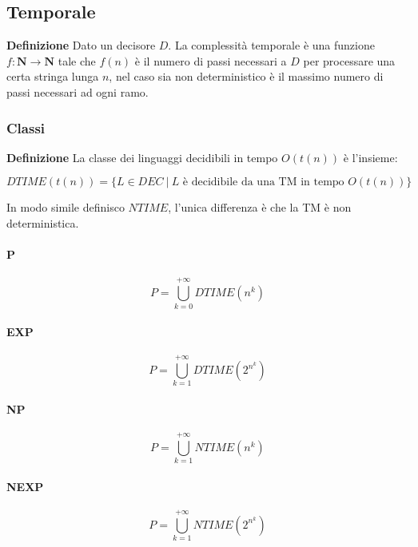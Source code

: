 \documentclass{article}
\begin{document}
\subsection{Temporale}

\textbf{Definizione} Dato un decisore $D$. La complessità temporale è una funzione $f:\mathbf{N}\rightarrow\mathbf{N}$ tale che $f(n)$ è il numero di passi necessari a $D$ per processare una certa stringa lunga $n$, nel caso sia non deterministico è il massimo numero di passi necessari ad ogni ramo.\newline

\subsubsection{Classi}

\noindent\textbf{Definizione} La classe dei linguaggi decidibili in tempo $O(t(n))$ è l'insieme:

$$DTIME(t(n))=\{L\in DEC\ |\ L\text{ è decidibile da una TM in tempo }O(t(n))\}$$\newline

\noindent In modo simile definisco $NTIME$, l'unica differenza è che la TM è non deterministica.

\newpage

\paragraph{P}

$$P=\bigcup_{k=0}^{+\infty}DTIME(n^k)$$\newline

\paragraph{EXP}

$$P=\bigcup_{k=1}^{+\infty}DTIME(2^{n^k})$$\newline

\paragraph{NP}

$$P=\bigcup_{k=1}^{+\infty}NTIME(n^k)$$\newline

\paragraph{NEXP}

$$P=\bigcup_{k=1}^{+\infty}NTIME(2^{n^k})$$
\end{document}

